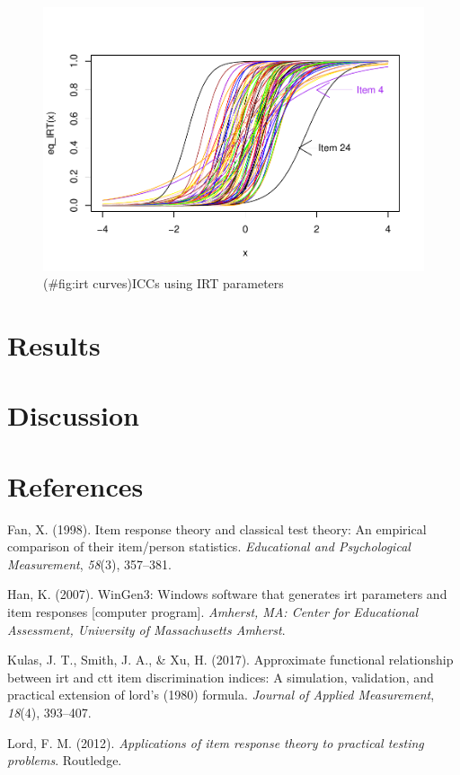 \documentclass[
  english,
  man,floatsintext]{apa6}
\begin{document}
\begin{figure}
\centering
\includegraphics{ICC_project_files/figure-latex/irt curves-1.pdf}
\caption{(\#fig:irt curves)ICCs using IRT parameters}
\end{figure}

\hypertarget{results-2}{%
\section{Results}\label{results-2}}

\hypertarget{discussion}{%
\section{Discussion}\label{discussion}}

\newpage

\hypertarget{references}{%
\section{References}\label{references}}

\begingroup
\setlength{\parindent}{-0.5in}
\setlength{\leftskip}{0.5in}

\hypertarget{refs}{}
\leavevmode\hypertarget{ref-fan1998item}{}%
Fan, X. (1998). Item response theory and classical test theory: An empirical comparison of their item/person statistics. \emph{Educational and Psychological Measurement}, \emph{58}(3), 357--381.

\leavevmode\hypertarget{ref-han2007wingen3}{}%
Han, K. (2007). WinGen3: Windows software that generates irt parameters and item responses {[}computer program{]}. \emph{Amherst, MA: Center for Educational Assessment, University of Massachusetts Amherst}.

\leavevmode\hypertarget{ref-kulas2017approximate}{}%
Kulas, J. T., Smith, J. A., \& Xu, H. (2017). Approximate functional relationship between irt and ctt item discrimination indices: A simulation, validation, and practical extension of lord's (1980) formula. \emph{Journal of Applied Measurement}, \emph{18}(4), 393--407.

\leavevmode\hypertarget{ref-lord2012applications}{}%
Lord, F. M. (2012). \emph{Applications of item response theory to practical testing problems}. Routledge.

\endgroup
\end{document}
